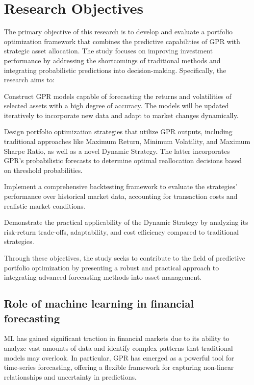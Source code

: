 \section{Research Objectives}
The primary objective of this research is to develop and evaluate a portfolio optimization framework that combines the predictive capabilities of GPR with strategic asset allocation. The study focuses on improving investment performance by addressing the shortcomings of traditional methods and integrating probabilistic predictions into decision-making. Specifically, the research aims to:

Construct GPR models capable of forecasting the returns and volatilities of selected assets with a high degree of accuracy. The models will be updated iteratively to incorporate new data and adapt to market changes dynamically.

Design portfolio optimization strategies that utilize GPR outputs, including traditional approaches like Maximum Return, Minimum Volatility, and Maximum Sharpe Ratio, as well as a novel Dynamic Strategy. The latter incorporates GPR’s probabilistic forecasts to determine optimal reallocation decisions based on threshold probabilities.

Implement a comprehensive backtesting framework to evaluate the strategies’ performance over historical market data, accounting for transaction costs and realistic market conditions.

Demonstrate the practical applicability of the Dynamic Strategy by analyzing its risk-return trade-offs, adaptability, and cost efficiency compared to traditional strategies.

Through these objectives, the study seeks to contribute to the field of predictive portfolio optimization by presenting a robust and practical approach to integrating advanced forecasting methods into asset management.

\subsection{Role of machine learning in financial forecasting}
\ac{ML} has gained significant traction in financial markets due to its ability to analyze vast amounts of data and identify complex patterns that traditional models may overlook.
In particular, \ac{GPR} has emerged as a powerful tool for time-series forecasting, offering a flexible framework for capturing non-linear relationships and uncertainty in predictions.

